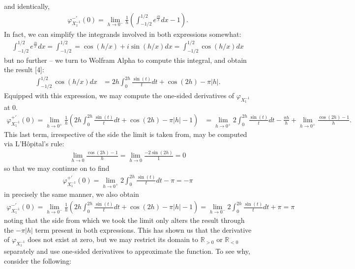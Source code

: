 \documentclass[10pt]{article}
\newcommand{\bp}[1]{\left({#1}\right)}
\newcommand{\mbb}[1]{\mathbb{#1}}
\newcommand{\1}[1]{\mathbbm{1}_{#1}}
\begin{document}
    and identically,
    \begin{align*}
        \varphi_{X_1^{-1}}^{-\prime}(0)=\lim_{h\rightarrow 0^-}\frac{1}{h}\bp{\int_{-1/2}^{1/2}e^{\tfrac{ih}{x}}dx-1}.
    \end{align*}
    In fact, we can simplify the integrands involved in both expressions somewhat:
    \begin{align*}
        \int_{-1/2}^{1/2}e^{\tfrac{ih}{x}}dx=\int_{-1/2}^{1/2}=\cos(h/x)+i\sin(h/x)dx=\int_{-1/2}^{1/2}\cos(h/x)dx
    \end{align*}
    but no further -- we turn to Wolfram Alpha to compute this integral, and obtain the result [4]:
    \begin{align*}
        \int_{-1/2}^{1/2}\cos(h/x)dx&=2h\int_0^{2h}\frac{\sin(t)}{t}dt+\cos(2h)-\pi|h|.
    \end{align*}
    Equipped with this expression, we may compute the one-sided derivatives of $\varphi_{X_1^{-1}}$ at $0$.
    \begin{align*}
        \varphi_{X_1^{-1}}^{+\prime}(0)=\lim_{h\rightarrow 0^+}\frac{1}{h}\bp{2h\int_0^{2h}\frac{\sin(t)}{t}dt+\cos(2h)-\pi|h|-1}&=\lim_{h\rightarrow 0^+}2\int_0^{2h}\frac{\sin(t)}{t}dt-\frac{\pi h}{h}+\lim_{h\rightarrow 0^+}\frac{\cos(2h)-1}{h}.
    \end{align*}
    This last term, irrespective of the side the limit is taken from, may be computed via L'H\^opital's rule:
    \begin{align*}
        \lim_{h\rightarrow 0}\frac{\cos(2h)-1}{h}=\lim_{h\rightarrow 0}\frac{-2\sin(2h)}{1}=0
    \end{align*}
    so that we may continue on to find
    \begin{align*}
        \varphi_{X_1^{-1}}^{+\prime}(0)=\lim_{h\rightarrow 0^+}2\int_0^{2h}\frac{\sin(t)}{t}dt-\pi=-\pi
    \end{align*}
    in precisely the same manner, we also obtain
    \begin{align*}
        \varphi_{X_1^{-1}}^{-\prime}(0)=\lim_{h\rightarrow 0^-}\frac{1}{h}\bp{2h\int_0^{2h}\frac{\sin(t)}{t}dt+\cos(2h)-\pi|h|-1}=\lim_{h\rightarrow 0^-}2\int_0^{2h}\frac{\sin(t)}{t}dt+\pi=\pi
    \end{align*}
    noting that the side from which we took the limit only alters the result through the $-\pi|h|$ term present in both expressions. This has shown us that the derivative of $\varphi_{X_1^{-1}}$ does not exist at zero,
    but we may restrict its domain to $\mbb{R}_{>0}$ or $\mbb{R}_{<0}$ separately and use one-sided derivatives to approximate the function. To see why, consider the following:
\end{document}
